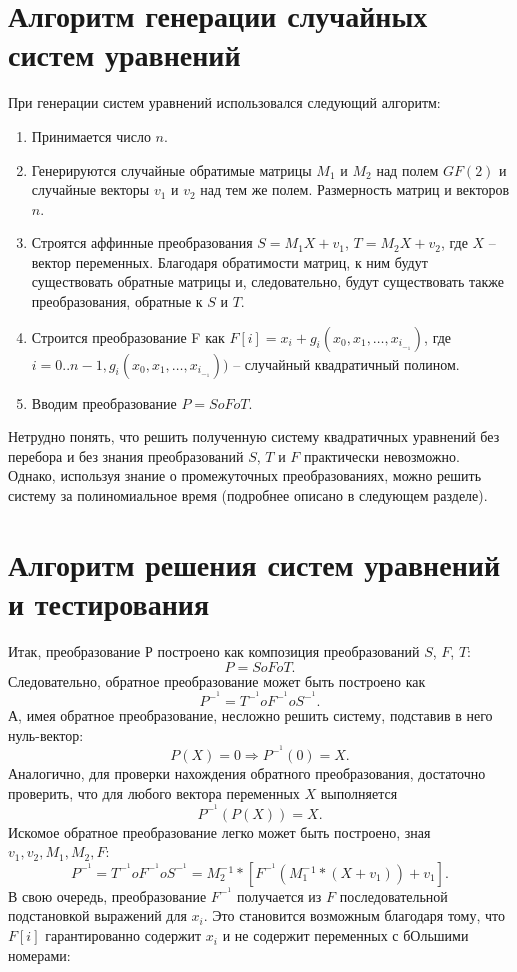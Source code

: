 \section{Алгоритм генерации случайных систем уравнений}

При генерации систем уравнений использовался следующий алгоритм:
\begin{enumerate}[1.]
	\item Принимается число \(n\).
	\item Генерируются случайные обратимые матрицы \(M_1\) и \(M_2\) над полем \(GF(2)\) и случайные векторы \(v_1\) и \(v_2\) над тем же полем. Размерность матриц и векторов \(n\).
	\item Строятся аффинные преобразования \(S=M_1X+v_1\), \(T=M_2X+v_2\), где \(X\) – вектор переменных. Благодаря обратимости матриц, к ним будут существовать обратные матрицы и, следовательно, будут существовать также преобразования, обратные к \(S\) и \(T\).
	\item Строится преобразование F как \(F[i]=x_i+g_i(x_0,x_1,…,x_i_-_1)\), где  \(i=0..n-1,g_i(x_0,x_1,…,x_i_-_1))\) – случайный квадратичный полином.
	\item Вводим преобразование \(P= SoFoT\).
\end{enumerate} 

Нетрудно понять, что решить полученную систему квадратичных уравнений без перебора и без знания преобразований \(S\), \(T\) и \(F\) практически невозможно. Однако, используя знание о промежуточных преобразованиях, можно решить систему за полиномиальное время (подробнее описано в следующем разделе). 


\section{Алгоритм решения систем уравнений и тестирования}
Итак, преобразование \(Р\) построено как композиция преобразований \(S\), \(F\), \(T\):
\begin{equation}P=SoFoT.\end{equation}
Следовательно, обратное преобразование может быть построено как
\begin{equation}P^-^1=T^-^1oF^-^1oS^-^1.\end{equation}
А, имея обратное преобразование, несложно решить систему, подставив в него нуль-вектор:
\begin{equation}P(X)=0\Rightarrow P^-^1(0)=X.\end{equation}
Аналогично, для проверки нахождения обратного преобразования, достаточно проверить, что для любого вектора переменных \(X\) выполняется
\begin{equation}P^-^1(P(X))=X.\end{equation}
Искомое обратное преобразование легко может быть построено, зная \(v_1,v_2,M_1,M_2,F\):
\begin{equation}P^-^1=T^-^1oF^-^1oS^-^1= M_2^-^1*[F^-^1 (M_1^-^1*(X+v_1 ))+v_1].\end{equation}
В свою очередь, преобразование \(F^-^1\) получается из \(F\) последовательной подстановкой выражений для \(x_i\). Это становится возможным благодаря тому, что \(F[i]\) гарантированно содержит \(x_i\) и не содержит переменных с бОльшими номерами:

